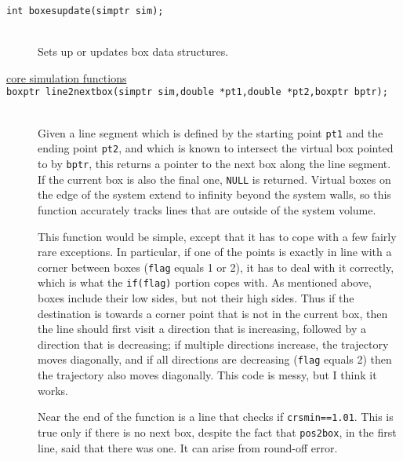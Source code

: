 \documentclass {book}
\begin{document}
\begin{description}
\item[\texttt{int boxesupdate(simptr sim);}]
\hfill \\
Sets up or updates box data structures.

\item[\underline{core simulation functions}]

\item[\texttt{boxptr line2nextbox(simptr sim,double *pt1,double *pt2,boxptr bptr);}]
\hfill \\
Given a line segment which is defined by the starting point \texttt{pt1} and the ending point \texttt{pt2}, and which is known to intersect the virtual box pointed to by \texttt{bptr}, this returns a pointer to the next box along the line segment.  If the current box is also the final one, \texttt{NULL} is returned.  Virtual boxes on the edge of the system extend to infinity beyond the system walls, so this function accurately tracks lines that are outside of the system volume.

This function would be simple, except that it has to cope with a few fairly rare exceptions.  In particular, if one of the points is exactly in line with a corner between boxes (\texttt{flag} equals 1 or 2), it has to deal with it correctly, which is what the \texttt{if(flag)} portion copes with.  As mentioned above, boxes include their low sides, but not their high sides.  Thus if the destination is towards a corner point that is not in the current box, then the line should first visit a direction that is increasing, followed by a direction that is decreasing; if multiple directions increase, the trajectory moves diagonally, and if all directions are decreasing (\texttt{flag} equals 2) then the trajectory also moves diagonally.  This code is messy, but I think it works.

Near the end of the function is a line that checks if \texttt{crsmin==1.01}.  This is true only if there is no next box, despite the fact that \texttt{pos2box}, in the first line, said that there was one.  It can arise from round-off error.


\end{description}
\end{document}
